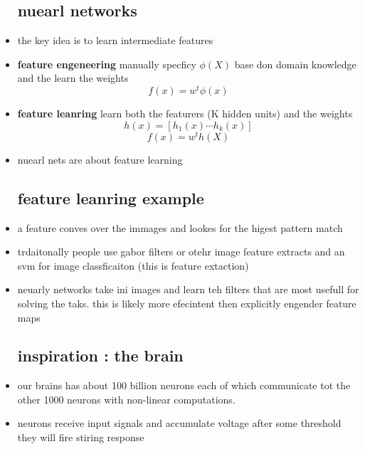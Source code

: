 \documentclass{article}
\begin{document}
\begin{itemize}
\subsection{nuearl networks}
\item the key idea is to learn intermediate features 
\item \textbf{feature engeneering} manually specficy $\phi(X)$ base don domain knowledge and the learn the weights $$f(x)=w^t\phi(x)$$
\item \textbf{feature leanring } learn both the featurers (K hidden units) and the weights $$h(x)=[h_1(x)\cdots h_k(x)]$$
$$f(x)=w^th(X)$$
\item nuearl nets are about feature learning 
\subsection{feature leanring example}
\item a feature conves over the immages and lookes for the higest pattern match 
\item trdaitonally people use gabor filters or otehr image feature extracts and an svm for image classficaiton (this is feature extaction)
\item neuarly networks take ini images and learn teh filters that are most usefull for solving the taks. this is likely more efecintent then explicitly engender feature maps 
\subsection{inspiration : the brain }
\item our brains has about 100 billion neurons each of which communicate tot the other 1000 neurons with non-linear computations. 
\item neurons receive input signals and accumulate voltage after some threshold they will fire stiring response 

\end{itemize}
\end{document}
